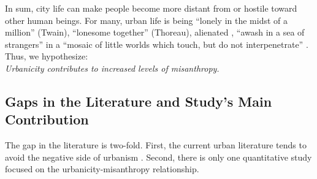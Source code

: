\documentclass[11pt, letterpaper]{article}
\begin{document}
\begin{spacing}{1.4}
% 



In sum, city life can make people become more distant from or hostile toward other human beings. %
For many, urban life is being ``lonely in the midst of a million'' (Twain), ``lonesome together''
(Thoreau), alienated \citep{wirth38,nettler1957measure}, ``awash in a sea of strangers''
\citep[Merry cited in][p. 99]{wilson85} in a ``mosaic of little worlds which touch, but do not interpenetrate'' \citep[][p. 40]{park84}. Thus, we hypothesize: \\
 
{\indent\hspace{1in}\textit{Urbanicity contributes to increased levels of misanthropy.\\}}
     

\subsection*{Gaps in the Literature and Study's Main Contribution} 

The gap in the literature is two-fold. First, the current urban literature tends to avoid the negative side of  urbanism \citep{thrift05,amin06,aokCityBook15,peck16}. Second, there is only one quantitative study  focused on the urbanicity-misanthropy relationship. 


\end{spacing}
\end{document}
